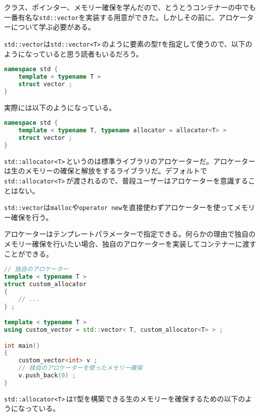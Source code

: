 
クラス、ポインター、メモリー確保を学んだので、とうとうコンテナーの中でも一番有名な\texttt{std::vector}を実装する用意ができた。しかしその前に、アロケーターについて学ぶ必要がある。

\texttt{std::vector}は\texttt{std::vector<T>}\,のように要素の型\texttt{T}を指定して使うので、以下のようになっていると思う読者もいるだろう。

\begin{lstlisting}[language={C++}]
namespace std {
    template < typename T >
    struct vector ;
}
\end{lstlisting}

実際には以下のようになっている。

\begin{lstlisting}[language={C++}]
namespace std {
    template < typename T, typename allocator = allocator<T> >
    struct vector ;
}
\end{lstlisting}

\texttt{std::allocator<T>}\,というのは標準ライブラリのアロケーターだ。アロケーターは生のメモリーの確保と解放をするライブラリだ。デフォルトで\texttt{std::allocator<T>}\,が渡されるので、普段ユーザーはアロケーターを意識することはない。

\texttt{std::vector}は\texttt{malloc}や\texttt{operator new}を直接使わずアロケーターを使ってメモリー確保を行う。

アロケーターはテンプレートパラメーターで指定できる。何らかの理由で独自のメモリー確保を行いたい場合、独自のアロケーターを実装してコンテナーに渡すことができる。

\ifTombow\pagebreak\fi
\begin{lstlisting}[language={C++}]
// 独自のアロケーター
template < typename T >
struct custom_allocator
{
    // ...
} ;

template < typename T >
using custom_vector = std::vector< T, custom_allocator<T> > ;

int main()
{
    custom_vector<int> v ;
    // 独自のアロケーターを使ったメモリー確保
    v.push_back(0) ;
}
\end{lstlisting}


\texttt{std::allocator<T>}\,は\texttt{T}型を構築できる生のメモリーを確保するための以下のようになっている。

